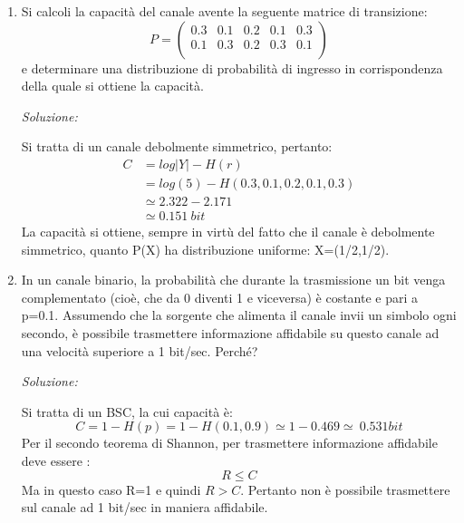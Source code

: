 \begin{enumerate}
       \bigskip
 \item Si calcoli la capacità del canale avente la seguente matrice di transizione:
      \[ P = \left(
        \begin{array}{ccccc}
           0.3  & 0.1  & 0.2 & 0.1 & 0.3 \\
           0.1  & 0.3  & 0.2 & 0.3 & 0.1\\
        \end{array} \right)
       \]
       e determinare una distribuzione di probabilità di ingresso in corrispondenza della quale si ottiene la capacità.
       \bigskip
       \bigskip

       \textit{Soluzione:}

       \noindent
       Si tratta di un canale debolmente simmetrico, pertanto:
       \[\begin{split}
        C &= log|Y|-H(r) \\
          &= log(5) - H(0.3,0.1,0.2,0.1,0.3) \\
          &\simeq 2.322 - 2.171 \\
          &\simeq 0.151 \ bit
         \end{split}
       \]
       La capacità si ottiene, sempre in virtù del fatto che il canale è debolmente simmetrico, quanto P(X) ha 
       distribuzione uniforme: X=(1/2,1/2).

       \bigskip
 \item In un canale binario, la probabilità che durante la trasmissione un bit venga complementato 
       (cioè, che da 0 diventi 1 e viceversa) è costante e pari a p=0.1.
        Assumendo che la sorgente che alimenta il canale invii un simbolo ogni secondo, è possibile 
        trasmettere informazione affidabile su questo canale ad una velocità superiore a 1 bit/sec. Perché?
       \bigskip
       \bigskip

       \textit{Soluzione:}

       \noindent
       Si tratta di un BSC, la cui capacità è:
       \[
        C=1-H(p)=1-H(0.1,0.9) \simeq 1-0.469 \simeq \ 0.531 bit
       \]
       Per il secondo teorema di Shannon, per trasmettere informazione affidabile deve essere :
       \[
        R \le C
       \]
       Ma in questo caso R=1 e quindi $R>C$. Pertanto non è possibile trasmettere sul canale ad 1 bit/sec in maniera 
       affidabile.
\end{enumerate}
